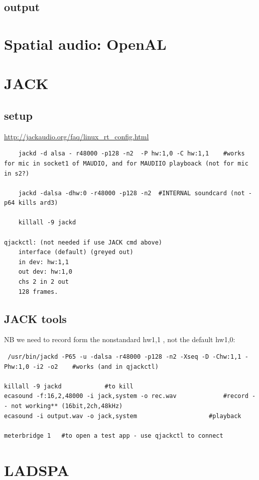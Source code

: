 \documentclass[oneside,english]{scrbook}
\begin{document}
\section{output}


\chapter{Spatial audio: OpenAL}

\chapter{JACK}

\section{setup}
\url{http://jackaudio.org/faq/linux_rt_config.html}

\begin{lstlisting}
    jackd -d alsa - r48000 -p128 -n2  -P hw:1,0 -C hw:1,1    #works for mic in socket1 of MAUDIO, and for MAUDIIO playboack (not for mic in s2?)

	jackd -dalsa -dhw:0 -r48000 -p128 -n2  #INTERNAL soundcard (not -p64 kills ard3)
	
	killall -9 jackd

qjackctl: (not needed if use JACK cmd above)
	interface (default) (greyed out)
	in dev: hw:1,1
	out dev: hw:1,0	
	chs 2 in 2 out
	128 frames.
\end{lstlisting}

\section{JACK tools}
NB we need to record form the nonstandard hw1,1 , not the default hw1,0:

\begin{lstlisting}
 /usr/bin/jackd -P65 -u -dalsa -r48000 -p128 -n2 -Xseq -D -Chw:1,1 -Phw:1,0 -i2 -o2    #works (and in qjackctl)

killall -9 jackd			#to kill
ecasound -f:16,2,48000 -i jack,system -o rec.wav  			 #record -- not working** (16bit,2ch,48kHz)
ecasound -i output.wav -o jack,system 					 #playback

meterbridge 1   #to open a test app - use qjackctl to connect
\end{lstlisting}


\chapter{LADSPA}
\end{document}
